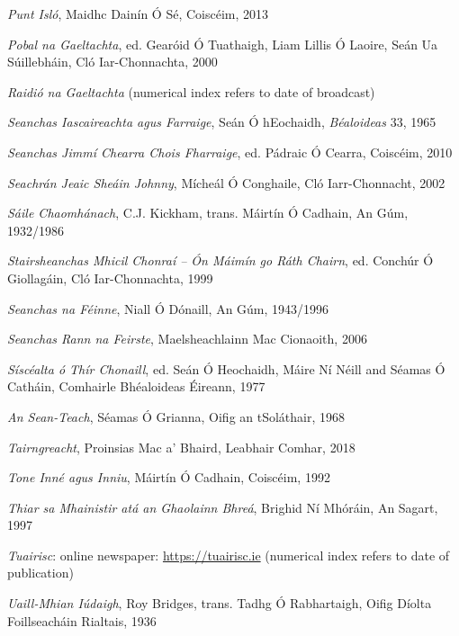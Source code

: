 \documentclass[output=paper,colorlinks,citecolor=brown]{langscibook}
\begin{document}
\begin{description}[leftmargin=!,labelwidth=\widthof{\textsc{agmts:}},font=\normalfont\scshape,noitemsep]
\item[pi:]  \textit{Punt Isló}, Maidhc Dainín Ó Sé, Coiscéim, 2013                                   
\item[png:]  \textit{Pobal na Gaeltachta}, ed. Gearóid Ó Tuathaigh, Liam Lillis Ó Laoire, Seán
                     Ua Súillebháin, Cló Iar-Chonnachta, 2000                                                
\item[rng:]  \textit{Raidió na Gaeltachta} (numerical index refers to date of broadcast)              
\item[sif:]  \textit{Seanchas Iascaireachta agus Farraige}, Seán Ó hEochaidh, \textit{Béaloideas} 33, 1965 
\item[sjccf:]  \textit{Seanchas Jimmí Chearra Chois Fharraige}, ed. Pádraic Ó Cearra, Coiscéim, 2010    
\item[sjsj:]  \textit{Seachrán Jeaic Sheáin Johnny}, Mícheál Ó Conghaile,  Cló Iarr-Chonnacht, 2002    
\item[sk:]  \textit{Sáile Chaomhánach}, C.J. Kickham, trans. Máirtín Ó Cadhain, An Gúm, 1932/1986    
\item[smc:]  \textit{Stairsheanchas Mhicil Chonraí -- Ón Máimín go Ráth Chairn}, ed. Conchúr
                      Ó Giollagáin, Cló Iar-Chonnachta, 1999                                                  
\item[snaf:]  \textit{Seanchas na Féinne}, Niall Ó Dónaill, An Gúm, 1943/1996                          
\item[srnf:]  \textit{Seanchas Rann na Feirste},  Maelsheachlainn Mac Cionaoith, 2006                  
\item[ssotc:]  \textit{Síscéalta ó Thír Chonaill}, ed. Seán Ó Heochaidh, Máire Ní Néill and Séamas 
                      Ó Catháin, Comhairle Bhéaloideas Éireann, 1977                                          
\item[st:]    \textit{An Sean-Teach},  Séamas Ó Grianna, Oifig an tSoláthair, 1968                     

\item[tair:]  \textit{Tairngreacht}, Proinsias Mac a' Bhaird, Leabhair Comhar, 2018                    
\item[tii:]  \textit{Tone Inné agus Inniu}, Máirtín Ó Cadhain, Coiscéim, 1992                         
\item[tmgb:]  \textit{Thiar sa Mhainistir atá an Ghaolainn Bhreá}, Brighid Ní Mhóráin, An Sagart, 1997 
\item[tuair:]  \textit{Tuairisc}: online newspaper: \url{https://tuairisc.ie} 
                      (numerical index refers to date of publication)                                         
\item[umi:]  \textit{Uaill-Mhian Iúdaigh}, Roy Bridges, trans. Tadhg Ó Rabhartaigh, Oifig Díolta 
                     Foillseacháin Rialtais, 1936
\end{description}


\printbibliography[heading=subbibliography,notkeyword=this]
\end{document}
